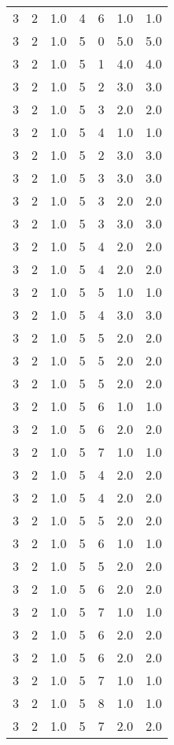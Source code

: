 \documentclass[a4paper,12pt]{article}
\begin{document}
\begin{center}
\begin{longtable}{ c c c | c c c | c }
        3 & 2 & 1.0 & 4 & 6 & 1.0 & 1.0 \\
        3 & 2 & 1.0 & 5 & 0 & 5.0 & 5.0 \\
        3 & 2 & 1.0 & 5 & 1 & 4.0 & 4.0 \\
        3 & 2 & 1.0 & 5 & 2 & 3.0 & 3.0 \\
        3 & 2 & 1.0 & 5 & 3 & 2.0 & 2.0 \\
        3 & 2 & 1.0 & 5 & 4 & 1.0 & 1.0 \\
        3 & 2 & 1.0 & 5 & 2 & 3.0 & 3.0 \\
        3 & 2 & 1.0 & 5 & 3 & 3.0 & 3.0 \\
        3 & 2 & 1.0 & 5 & 3 & 2.0 & 2.0 \\
        3 & 2 & 1.0 & 5 & 3 & 3.0 & 3.0 \\
        3 & 2 & 1.0 & 5 & 4 & 2.0 & 2.0 \\
        3 & 2 & 1.0 & 5 & 4 & 2.0 & 2.0 \\
        3 & 2 & 1.0 & 5 & 5 & 1.0 & 1.0 \\
        3 & 2 & 1.0 & 5 & 4 & 3.0 & 3.0 \\
        3 & 2 & 1.0 & 5 & 5 & 2.0 & 2.0 \\
        3 & 2 & 1.0 & 5 & 5 & 2.0 & 2.0 \\
        3 & 2 & 1.0 & 5 & 5 & 2.0 & 2.0 \\
        3 & 2 & 1.0 & 5 & 6 & 1.0 & 1.0 \\
        3 & 2 & 1.0 & 5 & 6 & 2.0 & 2.0 \\
        3 & 2 & 1.0 & 5 & 7 & 1.0 & 1.0 \\
        3 & 2 & 1.0 & 5 & 4 & 2.0 & 2.0 \\
        3 & 2 & 1.0 & 5 & 4 & 2.0 & 2.0 \\
        3 & 2 & 1.0 & 5 & 5 & 2.0 & 2.0 \\
        3 & 2 & 1.0 & 5 & 6 & 1.0 & 1.0 \\
        3 & 2 & 1.0 & 5 & 5 & 2.0 & 2.0 \\
        3 & 2 & 1.0 & 5 & 6 & 2.0 & 2.0 \\
        3 & 2 & 1.0 & 5 & 7 & 1.0 & 1.0 \\
        3 & 2 & 1.0 & 5 & 6 & 2.0 & 2.0 \\
        3 & 2 & 1.0 & 5 & 6 & 2.0 & 2.0 \\
        3 & 2 & 1.0 & 5 & 7 & 1.0 & 1.0 \\
        3 & 2 & 1.0 & 5 & 8 & 1.0 & 1.0 \\
        3 & 2 & 1.0 & 5 & 7 & 2.0 & 2.0 \\

\end{longtable}
\end{center}
\end{document}
